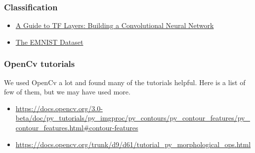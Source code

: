 \documentclass[Report.tex]{subfiles}
\begin{document}
\subsubsection{Classification}
\begin{itemize}
    \item \href{https://www.tensorflow.org/tutorials/layers}{A Guide to TF Layers: Building a Convolutional Neural Network}
    \item \href{https://www.nist.gov/itl/iad/image-group/emnist-dataset}{The EMNIST Dataset}
\end{itemize}

\subsubsection{OpenCv tutorials}
We used OpenCv a lot and found many of the tutorials helpful. Here is a list of few of them, but we may have used more.
\begin{itemize}
    \item \url{https://docs.opencv.org/3.0-beta/doc/py_tutorials/py_imgproc/py_contours/py_contour_features/py_contour_features.html#contour-features}
    \item \url{https://docs.opencv.org/trunk/d9/d61/tutorial_py_morphological_ops.html}
\end{itemize}
\end{document}
